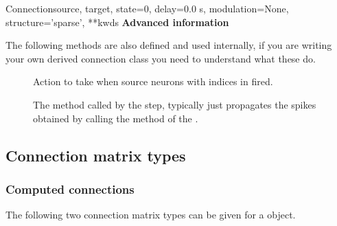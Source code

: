 \documentclass[letterpaper,10pt]{manual}
\begin{document}
\begin{classdesc}{Connection}{source, target, state=0, delay=0.0 s, modulation=None, structure='sparse', **kwds}
\textbf{Advanced information}

The following methods are also defined and used internally, if you are
writing your own derived connection class you need to understand what
these do.
\begin{description}
\item[]
Action to take when source neurons with indices in 
fired.

\item[]
The method called by the \hyperlink{brian.Network}{}  step,
typically just propagates the spikes obtained by calling
the  method of the  \hyperlink{brian.NeuronGroup}{}.

\end{description}
\end{classdesc}

\hypertarget{index-67}{}\subsection{Connection matrix types}

\hypertarget{index-68}{}\subsubsection{Computed connections}

The following two connection matrix types can be given for a
\hyperlink{brian.Connection}{} object.
\end{document}
